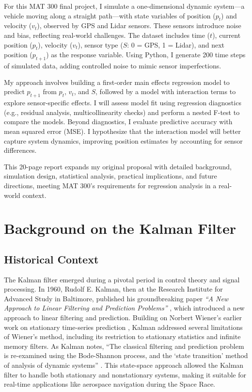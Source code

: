 \documentclass[12pt]{article}
\begin{document}
For this MAT 300 final project, I simulate a one-dimensional dynamic system—a vehicle moving along a straight path—with state variables of position (\( p_t \)) and velocity (\( v_t \)), observed by GPS and Lidar sensors. These sensors introduce noise and bias, reflecting real-world challenges. The dataset includes time (\( t \)), current position (\( p_t \)), velocity (\( v_t \)), sensor type (\( S \): 0 = GPS, 1 = Lidar), and next position (\( p_{t+1} \)) as the response variable. Using Python, I generate 200 time steps of simulated data, adding controlled noise to mimic sensor imperfections.

My approach involves building a first-order main effects regression model to predict \( p_{t+1} \) from \( p_t \), \( v_t \), and \( S \), followed by a model with interaction terms to explore sensor-specific effects. I will assess model fit using regression diagnostics (e.g., residual analysis, multicollinearity checks) and perform a nested F-test to compare the models. Beyond diagnostics, I evaluate predictive accuracy with mean squared error (MSE). I hypothesize that the interaction model will better capture system dynamics, improving position estimates by accounting for sensor differences.

This 20-page report expands my original proposal with detailed background, simulation design, statistical analysis, practical implications, and future directions, meeting MAT 300’s requirements for regression analysis in a real-world context.

\section{Background on the Kalman Filter}
\label{sec:background}

\subsection{Historical Context}
\label{subsec:historical_context}

The Kalman filter emerged during a pivotal period in control theory and signal processing. In 1960, Rudolf E. Kalman, then at the Research Institute for Advanced Study in Baltimore, published his groundbreaking paper \textit{``A New Approach to Linear Filtering and Prediction Problems''} \cite{kalman1960}, which introduced a new approach to linear filtering and prediction. Building on Norbert Wiener’s earlier work on stationary time-series prediction \cite{wiener1949}, Kalman addressed several limitations of Wiener’s method, including its restriction to stationary statistics and infinite memory filters. As Kalman notes, “The classical filtering and prediction problem is re-examined using the Bode-Shannon process, and the ‘state transition’ method of analysis of dynamic systems” \cite{kalman1960}. This state-space approach allowed the Kalman filter to handle both stationary and nonstationary systems, making it suitable for real-time applications like aerospace navigation during the Space Race.
\end{document}
